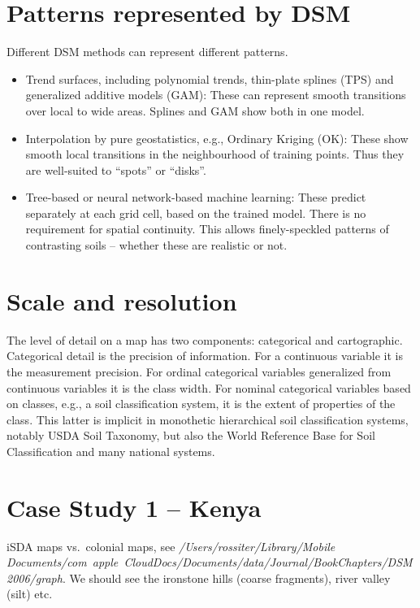 \documentclass[soil, manuscript]{copernicus}
\begin{document}
\section{Patterns represented by DSM}

\par
Different DSM methods can represent different patterns.

\begin{itemize}
\item Trend surfaces, including polynomial trends, thin-plate splines (TPS) and generalized additive models (GAM): These can represent smooth transitions over local to wide areas.  Splines and GAM show both in one model.
\item Interpolation by pure geostatistics, e.g., Ordinary Kriging (OK): These show smooth local transitions in the neighbourhood of training points. Thus they are well-suited to ``spots'' or ``disks''.
\item Tree-based or neural network-based machine learning: These predict separately at each grid cell, based on the trained model. There is no requirement for spatial continuity.  This allows finely-speckled patterns of contrasting soils -- whether these are realistic or not.
\end{itemize}


\section{Scale and resolution}

\par
The level of detail on a map has two components: categorical and cartographic.
%
Categorical detail is the precision of information. For a continuous variable it is the measurement precision.
%
For ordinal categorical variables generalized from continuous variables it is the class width.
%
For nominal categorical variables based on classes, e.g., a soil classification system, it is the extent of properties of the class.
%
This latter is implicit in monothetic hierarchical soil classification systems, notably USDA Soil Taxonomy, but also the World Reference Base for Soil Classification and many national systems.

\section{Case Study 1 -- Kenya}

iSDA maps vs.\ colonial maps, see \emph{/Users/rossiter/Library/Mobile Documents/com~apple~CloudDocs/Documents/data/Journal/BookChapters/DSM2006/graph}. We should see the ironstone hills (coarse fragments), river valley (silt) etc.
\end{document}
